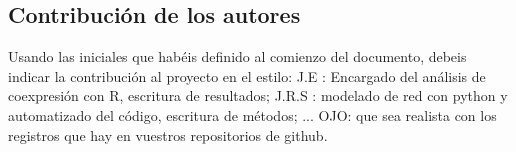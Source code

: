 \documentclass{bmcart}
\begin{document}
\begin{backmatter}
		\section*{Contribución de los autores}
			Usando las iniciales que habéis definido al comienzo del documento, debeis indicar la contribución al proyecto en el estilo:
			J.E : Encargado del análisis de coexpresión con R, escritura de resultados; J.R.S : modelado de red con python y automatizado del código, escritura de métodos; ...
			OJO: que sea realista con los registros que hay en vuestros repositorios de github. 
		
		
		
	
	\end{backmatter}
\end{document}
